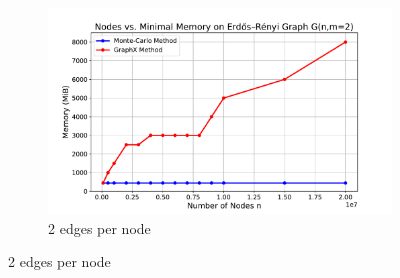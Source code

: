 \begin{figure}[H]
\begin{subfigure}[t]{0.47\linewidth}
        \centering
        \includegraphics[width=\linewidth]{images/plots/ER_2edg/nodes_vs_mvm_2edges.pdf}
        \caption{2 edges per node}
        \label{fig:2mvm}
    \end{subfigure}\hfill
\end{figure}

